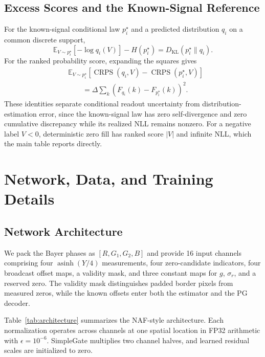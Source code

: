 \documentclass[10pt,twocolumn,journal]{IEEEtran}
\begin{document}
\subsection{Excess Scores and the Known-Signal Reference}
For the known-signal conditional law $p_i^\star$ and a predicted distribution $q_i$ on a common discrete support,
\begin{equation}
\mathbb E_{V\sim p_i^\star}[-\log q_i(V)]-H(p_i^\star)=D_{\mathrm{KL}}(p_i^\star\|q_i).
\end{equation}
For the ranked probability score, expanding the squares gives
\begin{equation}
\begin{split}
&\mathbb E_{V\sim p_i^\star}[\operatorname{CRPS}(q_i,V)-\operatorname{CRPS}(p_i^\star,V)]\\
&\qquad=\Delta\sum_k\left(F_{q_i}(k)-F_{p_i^\star}(k)\right)^2.
\end{split}
\end{equation}
These identities separate conditional readout uncertainty from distribution-estimation error, since the known-signal law has zero self-divergence and zero cumulative discrepancy while its realized NLL remains nonzero. For a negative label $V<0$, deterministic zero fill has ranked score $|V|$ and infinite NLL, which the main table reports directly.

\section{Network, Data, and Training Details}
\subsection{Network Architecture}
We pack the Bayer phases as $[R,G_1,G_2,B]$ and provide 16 input channels comprising four $\operatorname{asinh}(Y/4)$ measurements, four zero-candidate indicators, four broadcast offset maps, a validity mask, and three constant maps for $g$, $\sigma_r$, and a reserved zero. The validity mask distinguishes padded border pixels from measured zeros, while the known offsets enter both the estimator and the PG decoder.

Table~\ref{tab:architecture} summarizes the NAF-style architecture. Each normalization operates across channels at one spatial location in FP32 arithmetic with $\epsilon=10^{-6}$. SimpleGate multiplies two channel halves, and learned residual scales are initialized to zero.
\end{document}
